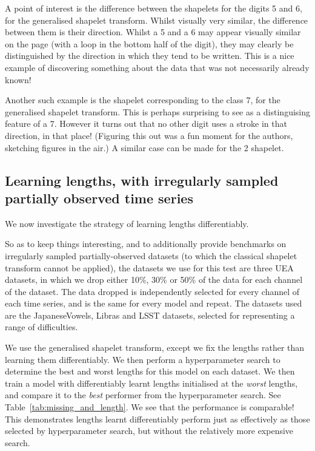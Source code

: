 \documentclass{article}
\theoremstyle{plain}
\theoremstyle{definition}
\begin{document}
A point of interest is the difference between the shapelets for the digits 5 and 6, for the generalised shapelet transform. Whilst visually very similar, the difference between them is their direction. Whilst a 5 and a 6 may appear visually similar on the page (with a loop in the bottom half of the digit), they may clearly be distinguished by the direction in which they tend to be written. This is a nice example of discovering something about the data that was not necessarily already known!

Another such example is the shapelet corresponding to the class 7, for the generalised shapelet transform. This is perhaps surprising to see as a distinguising feature of a 7. However it turns out that no other digit uses a stroke in that direction, in that place! (Figuring this out was a fun moment for the authors, sketching figures in the air.) A similar case can be made for the 2 shapelet.

\subsection{Learning lengths, with irregularly sampled partially observed time series} \label{subsec:uea_missing_and_length}
We now investigate the strategy of learning lengths differentiably.

So as to keep things interesting, and to additionally provide benchmarks on irregularly sampled partially-observed datasets (to which the classical shapelet transform cannot be applied), the datasets we use for this test are three UEA datasets, in which we drop either 10\%, 30\% or 50\% of the data for each channel of the dataset. The data dropped is independently selected for every channel of each time series, and is the same for every model and repeat. The datasets used are the JapaneseVowels, Libras and LSST datasets, selected for representing a range of difficulties.

We use the generalised shapelet transform, except we fix the lengths rather than learning them differentiably. We then perform a hyperparameter search to determine the best and worst lengths for this model on each dataset. We then train a model with differentiably learnt lengths initialised at the \emph{worst} lengths, and compare it to the \emph{best} performer from the hyperparameter search. See Table~\ref{tab:missing_and_length}. We see that the performance is comparable! This demonstrates lengths learnt differentiably perform just as effectively as those selected by hyperparameter search, but without the relatively more expensive search.
\end{document}
